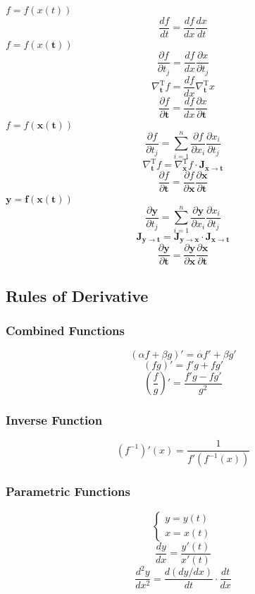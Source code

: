 \documentclass{article}
\begin{document}
$f = f(x(t))$
\[
    \frac{df}{dt} = \frac{df}{dx} \frac{dx}{dt}
\]
$f = f(x(\mathbf{t}))$
\[
    \frac{\partial f}{\partial t_j} = \frac{df}{dx} \frac{\partial x}{\partial t_j}
\]
\[
    \nabla_{\mathbf{t}}^{\mathrm{T}} f = \frac{df}{dx} \nabla_{\mathbf{t}}^{\mathrm{T}} x
\]
\[
    \frac{\partial f}{\partial \mathbf{t}} = \frac{df}{dx} \frac{\partial x}{\partial \mathbf{t}}
\]
$f = f(\mathbf{x}(\mathbf{t}))$
\[
    \frac{\partial f}{\partial t_j} = \sum_{i=1}^n \frac{\partial f}{\partial x_i} \frac{\partial x_i}{\partial t_j}
\]
\[
    \nabla_{\mathbf{t}}^{\mathrm{T}} f = \nabla_{\mathbf{x}}^{\mathrm{T}} f \cdot \mathbf{J}_{\mathbf{x} \to \mathbf{t}}
\]
\[
    \frac{\partial f}{\partial \mathbf{t}} = \frac{\partial f}{\partial \mathbf{x}} \frac{\partial \mathbf{x}}{\partial \mathbf{t}}
\]
$\mathbf{y} = \mathbf{f}(\mathbf{x}(\mathbf{t}))$
\[
    \frac{\partial \mathbf{y}}{\partial t_j} = \sum_{i=1}^n \frac{\partial \mathbf{y}}{\partial x_i} \frac{\partial x_i}{\partial t_j}
\]
\[
    \mathbf{J}_{\mathbf{y} \to \mathbf{t}} = \mathbf{J}_{\mathbf{y} \to \mathbf{x}} \cdot \mathbf{J}_{\mathbf{x} \to \mathbf{t}}
\]
\[
    \frac{\partial \mathbf{y}}{\partial \mathbf{t}} = \frac{\partial \mathbf{y}}{\partial \mathbf{x}} \frac{\partial \mathbf{x}}{\partial \mathbf{t}}
\]

\subsection{Rules of Derivative}

\subsubsection{Combined Functions}

\[
    (\alpha f + \beta g)' = \alpha f' + \beta g'
\]
\[
    (fg)' = f'g + fg'
\]
\[
    \left(\frac{f}{g}\right)' = \frac{f'g - fg'}{g^2}
\]

\subsubsection{Inverse Function}

\[
    (f^{-1})'(x) = \frac{1}{f'(f^{-1}(x))}
\]

\subsubsection{Parametric Functions}

\[
    \begin{cases}
        y = y(t) \\
        x = x(t)
    \end{cases}
\]
\[
    \frac{dy}{dx} = \frac{y'(t)}{x'(t)}
\]
\[
    \frac{d^2y}{dx^2} = \frac{d(dy/dx)}{dt} \cdot \frac{dt}{dx}
\]
\end{document}
